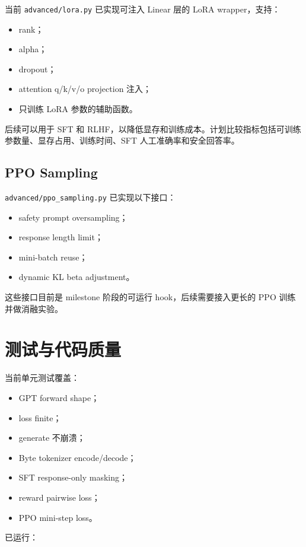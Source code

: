 \documentclass[UTF8,zihao=-4]{ctexart}
\begin{document}
当前 \texttt{advanced/lora.py} 已实现可注入 Linear 层的 LoRA wrapper，支持：

\begin{itemize}
  \item rank；
  \item alpha；
  \item dropout；
  \item attention q/k/v/o projection 注入；
  \item 只训练 LoRA 参数的辅助函数。
\end{itemize}

后续可以用于 SFT 和 RLHF，以降低显存和训练成本。计划比较指标包括可训练参数量、显存占用、训练时间、SFT 人工准确率和安全回答率。

\subsection{PPO Sampling}

\texttt{advanced/ppo\_sampling.py} 已实现以下接口：

\begin{itemize}
  \item safety prompt oversampling；
  \item response length limit；
  \item mini-batch reuse；
  \item dynamic KL beta adjustment。
\end{itemize}

这些接口目前是 milestone 阶段的可运行 hook，后续需要接入更长的 PPO 训练并做消融实验。

\section{测试与代码质量}

当前单元测试覆盖：

\begin{itemize}
  \item GPT forward shape；
  \item loss finite；
  \item generate 不崩溃；
  \item Byte tokenizer encode/decode；
  \item SFT response-only masking；
  \item reward pairwise loss；
  \item PPO mini-step loss。
\end{itemize}

已运行：
\end{document}
